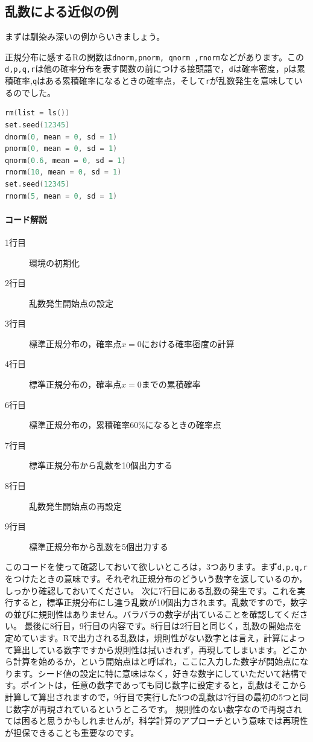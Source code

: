 \documentclass{ltjsbook}
\begin{document}
\subsection{乱数による近似の例}
まずは馴染み深いの例からいきましょう。

正規分布に感するRの関数は\texttt{dnorm,pnorm, qnorm ,rnorm}などがあります。この\texttt{d,p,q,r}は他の確率分布を表す関数の前につける接頭語で，\texttt{d}は確率密度，\texttt{p}は累積確率,\texttt{q}はある累積確率になるときの確率点，そして\texttt{r}が乱数発生を意味しているのでした。

\begin{lstlisting}[language=c++,label={code::17_01},caption={乱数のコードの例}]
rm(list = ls())
set.seed(12345)
dnorm(0, mean = 0, sd = 1)
pnorm(0, mean = 0, sd = 1)
qnorm(0.6, mean = 0, sd = 1)
rnorm(10, mean = 0, sd = 1)
set.seed(12345)
rnorm(5, mean = 0, sd = 1)
\end{lstlisting}
\paragraph{コード解説}
\begin{description}
        \item[1行目] 環境の初期化
        \item[2行目] 乱数発生開始点の設定
        \item[3行目] 標準正規分布の，確率点$x=0$における確率密度の計算
        \item[4行目] 標準正規分布の，確率点$x=0$までの累積確率
        \item[6行目] 標準正規分布の，累積確率60\%になるときの確率点
        \item[7行目] 標準正規分布から乱数を10個出力する
        \item[8行目] 乱数発生開始点の再設定
        \item[9行目] 標準正規分布から乱数を5個出力する
\end{description}

このコードを使って確認しておいて欲しいところは，3つあります。まず\texttt{d,p,q,r}をつけたときの意味です。それぞれ正規分布のどういう数字を返しているのか，しっかり確認しておいてください。
次に7行目にある乱数の発生です。これを実行すると，標準正規分布にし違う乱数が10個出力されます。乱数ですので，数字の並びに規則性はありません。バラバラの数字が出ていることを確認してください。
最後に8行目，9行目の内容です。8行目は2行目と同じく，乱数の開始点を定めています。Rで出力される乱数は，規則性がない数字とは言え，計算によって算出している数字ですから規則性は拭いきれず，再現してしまいます。どこから計算を始めるか，という開始点はと呼ばれ，ここに入力した数字が開始点になります。シード値の設定に特に意味はなく，好きな数字にしていただいて結構です。ポイントは，任意の数字であっても同じ数字に設定すると，乱数はそこから計算して算出されますので，9行目で実行した5つの乱数は7行目の最初の5つと同じ数字が再現されているというところです。
規則性のない数字なので再現されては困ると思うかもしれませんが，科学計算のアプローチという意味では再現性が担保できることも重要なのです。
\end{document}
